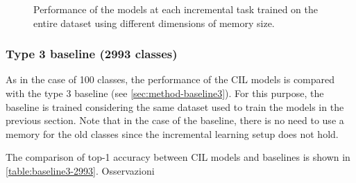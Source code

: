 \begin{figure}[H]
	\centering
    \qquad
	\caption{Performance of the models at each incremental task trained on the entire dataset using different dimensions of memory size.}%
	\label{fig:exp6}%
\end{figure}

\newpage

\subsubsection{Type 3 baseline (2993 classes)}
As in the case of 100 classes, the performance of the CIL models is compared with the type 3 baseline (see \autoref{sec:method-baseline3}). For this purpose, the baseline is trained considering the same dataset used to train the models in the previous section.
Note that in the case of the baseline, there is no need to use a memory for the old classes since the incremental learning setup does not hold.
 
The comparison of top-1 accuracy between CIL models and baselines is shown in \autoref{table:baseline3-2993}.
Osservazioni


